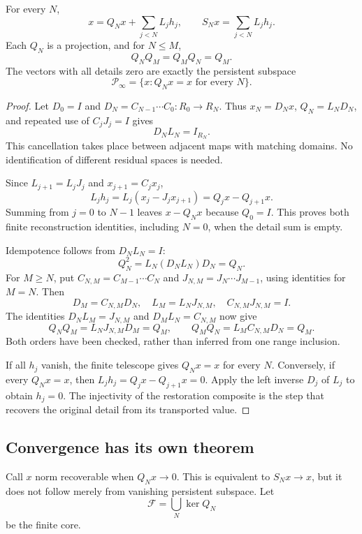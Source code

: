 \begin{theorem}\label{KS26}
For every \(N\),
\[
 x=Q_Nx+\sum_{j<N}L_jh_j,
 \qquad S_Nx=\sum_{j<N}L_jh_j.
\]
Each \(Q_N\) is a projection, and for \(N\le M\),
\[
 Q_NQ_M=Q_MQ_N=Q_M.
\]
The vectors with all details zero are exactly the persistent subspace
\[
 \mathcal P_\infty=\{x:Q_Nx=x\text{ for every }N\}.
\]
\end{theorem}
\begin{proof}
Let $D_0=I$ and $D_N=C_{N-1}\cdots C_0:R_0\to R_N$. Thus $x_N=D_Nx$, $Q_N=L_ND_N$, and repeated use of $C_jJ_j=I$ gives
\[
 D_NL_N=I_{R_N}.
\]
This cancellation takes place between adjacent maps with matching domains. No identification of different residual spaces is needed.

Since $L_{j+1}=L_jJ_j$ and $x_{j+1}=C_jx_j$,
\[
 L_jh_j=L_j(x_j-J_jx_{j+1})=Q_jx-Q_{j+1}x.
\]
Summing from $j=0$ to $N-1$ leaves $x-Q_Nx$ because $Q_0=I$. This proves both finite reconstruction identities, including $N=0$, when the detail sum is empty.

Idempotence follows from $D_NL_N=I$:
\[
 Q_N^2=L_N(D_NL_N)D_N=Q_N.
\]
For $M\ge N$, put $C_{N,M}=C_{M-1}\cdots C_N$ and $J_{N,M}=J_N\cdots J_{M-1}$, using identities for $M=N$. Then
\[
 D_M=C_{N,M}D_N,\quad L_M=L_NJ_{N,M},\quad C_{N,M}J_{N,M}=I.
\]
The identities $D_NL_M=J_{N,M}$ and $D_ML_N=C_{N,M}$ now give
\[
 Q_NQ_M=L_NJ_{N,M}D_M=Q_M,\qquad
 Q_MQ_N=L_MC_{N,M}D_N=Q_M.
\]
Both orders have been checked, rather than inferred from one range inclusion.

If all $h_j$ vanish, the finite telescope gives $Q_Nx=x$ for every $N$. Conversely, if every $Q_Nx=x$, then $L_jh_j=Q_jx-Q_{j+1}x=0$. Apply the left inverse $D_j$ of $L_j$ to obtain $h_j=0$. The injectivity of the restoration composite is the step that recovers the original detail from its transported value.
\end{proof}


\subsection{Convergence has its own theorem}
Call \(x\) norm recoverable when \(Q_Nx\to0\). This is equivalent to \(S_Nx\to x\), but it does not follow merely from vanishing persistent subspace. Let
\[
 \mathcal F=\bigcup_N\ker Q_N
\]
be the finite core.

